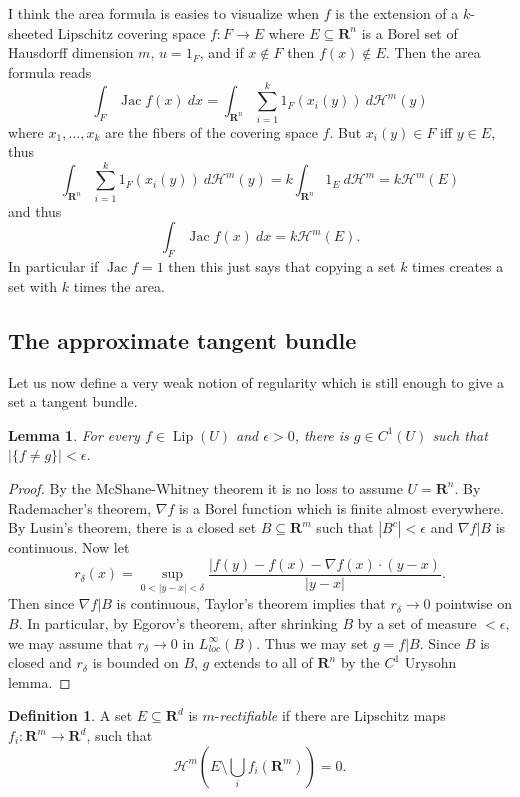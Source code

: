 \documentclass[reqno,12pt,letterpaper]{amsart}
\newcommand{\RR}{\mathbf{R}}
\DeclareMathOperator{\Jac}{Jac}
\DeclareMathOperator{\Lip}{Lip}
\newcommand{\dfn}[1]{\emph{#1}\index{#1}}
\newtheorem{lemma}[theorem]{Lemma}
\theoremstyle{definition}
\newtheorem{definition}[theorem]{Definition}
\numberwithin{equation}{section}
\begin{document}
I think the area formula is easies to visualize when $f$ is the extension of a $k$-sheeted Lipschitz covering space $f: F \to E$ where $E \subseteq \RR^n$ is a Borel set of Hausdorff dimension $m$, $u = 1_F$, and if $x \notin F$ then $f(x) \notin E$. Then the area formula reads
$$\int_F \Jac f(x) ~dx = \int_{\RR^n} \sum_{i=1}^k 1_F(x_i(y)) ~d\mathcal H^m(y)$$
where $x_1, \dots, x_k$ are the fibers of the covering space $f$.
But $x_i(y) \in F$ iff $y \in E$, thus
$$\int_{\RR^n} \sum_{i=1}^k 1_F(x_i(y)) ~d\mathcal H^m(y) = k\int_{\RR^n} 1_E ~d\mathcal H^m = k\mathcal H^m(E)$$
and thus
$$\int_F \Jac f(x) ~dx = k\mathcal H^m(E).$$
In particular if $\Jac f = 1$ then this just says that copying a set $k$ times creates a set with $k$ times the area.

\subsection{The approximate tangent bundle}
Let us now define a very weak notion of regularity which is still enough to give a set a tangent bundle.

\begin{lemma}
\label{Lipschitz is nearly C1}
For every $f \in \Lip(U)$ and $\epsilon > 0$, there is $g \in C^1(U)$ such that $|\{f \neq g\}| < \epsilon$.
\end{lemma}
\begin{proof}
By the McShane-Whitney theorem it is no loss to assume $U = \RR^n$.
By Rademacher's theorem, $\nabla f$ is a Borel function which is finite almost everywhere.
By Lusin's theorem, there is a closed set $B \subseteq \RR^m$ such that $|B^c| < \epsilon$ and $\nabla f|B$ is continuous.
Now let
$$r_\delta(x) = \sup_{0 < |y - x| < \delta} \frac{|f(y) - f(x) - \nabla f(x) \cdot (y - x)}{|y - x|}.$$
Then since $\nabla f|B$ is continuous, Taylor's theorem implies that $r_\delta \to 0$ pointwise on $B$.
In particular, by Egorov's theorem, after shrinking $B$ by a set of measure $< \epsilon$, we may assume that $r_\delta \to 0$ in $L^\infty_{loc}(B)$.
Thus we may set $g = f|B$.
Since $B$ is closed and $r_\delta$ is bounded on $B$, $g$ extends to all of $\RR^n$ by the $C^1$ Urysohn lemma.
\end{proof}

\begin{definition}
A set $E \subseteq \RR^d$ is $m$-\dfn{rectifiable} if there are Lipschitz maps $f_i: \RR^m \to \RR^d$, such that
$$\mathcal H^m\left(E \setminus \bigcup_i f_i(\RR^m)\right) = 0.$$
\end{definition}
\end{document}
